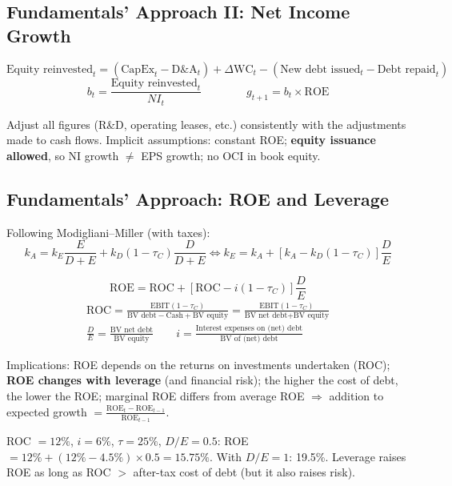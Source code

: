\subsection{Fundamentals' Approach II: Net Income Growth}
\begin{keybox}
\[
\text{Equity reinvested}_t=(\text{CapEx}_t-\text{D\&A}_t)+\Delta\text{WC}_t-(\text{New debt issued}_t-\text{Debt repaid}_t)
\]
\[
b_t=\frac{\text{Equity reinvested}_t}{NI_t}\qquad\qquad g_{t+1}=b_t\times\text{ROE}
\]
\end{keybox}
Adjust all figures (R\&D, operating leases, etc.) consistently with the adjustments made to cash flows. Implicit assumptions: constant ROE; \textbf{equity issuance allowed}, so NI growth $\neq$ EPS growth; no OCI in book equity.

\subsection{Fundamentals' Approach: ROE and Leverage}
Following Modigliani--Miller (with taxes):
\[
k_A=k_E\frac{E}{D+E}+k_D(1-\tau_C)\frac{D}{D+E}\iff k_E=k_A+[k_A-k_D(1-\tau_C)]\frac{D}{E}
\]
\begin{keybox}
\[
\text{ROE}=\text{ROC}+[\text{ROC}-i(1-\tau_C)]\frac{D}{E}
\]
\vspace{-6pt}
\begin{gather*}
\text{ROC}=\frac{\text{EBIT}(1-\tau_C)}{\text{BV debt}-\text{Cash}+\text{BV equity}}=\frac{\text{EBIT}(1-\tau_C)}{\text{BV net debt}+\text{BV equity}}\\
\frac{D}{E}=\frac{\text{BV net debt}}{\text{BV equity}}\qquad i=\frac{\text{Interest expenses on (net) debt}}{\text{BV of (net) debt}}
\end{gather*}
\end{keybox}
Implications: ROE depends on the returns on investments undertaken (ROC); \textbf{ROE changes with leverage} (and financial risk); the higher the cost of debt, the lower the ROE; marginal ROE differs from average ROE $\Rightarrow$ addition to expected growth $=\frac{\text{ROE}_t-\text{ROE}_{t-1}}{\text{ROE}_{t-1}}$.
\begin{exbox}
ROC $=12\%$, $i=6\%$, $\tau=25\%$, $D/E=0.5$: ROE $=12\%+(12\%-4.5\%)\times0.5=15.75\%$. With $D/E=1$: 19.5\%. Leverage raises ROE as long as ROC $>$ after-tax cost of debt (but it also raises risk).
\end{exbox}

